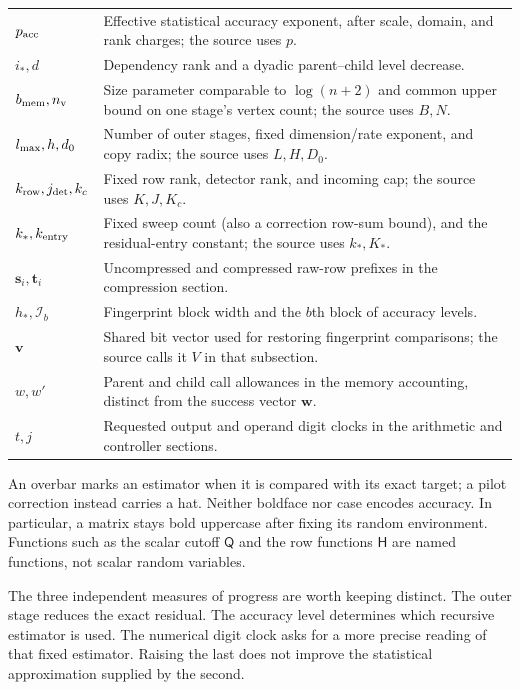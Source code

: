 \documentclass[11pt]{article}
\numberwithin{equation}{section}
\theoremstyle{definition}
\theoremstyle{remark}
\begin{document}
\begin{longtable}{@{}p{}p{}@{}}
$p_{\rm acc}$ & Effective statistical accuracy exponent, after scale, domain, and rank charges; the source uses $p$.\\
$i_*,d$ & Dependency rank and a dyadic parent--child level decrease.\\
$b_{\rm mem},n_{\rm v}$ & Size parameter comparable to $\log(n+2)$ and common upper bound on one stage's vertex count; the source uses $B,N$.\\
$l_{\rm max},h,d_0$ & Number of outer stages, fixed dimension/rate exponent, and copy radix; the source uses $L,H,D_0$.\\
$k_{\rm row},j_{\rm det},k_c$ & Fixed row rank, detector rank, and incoming cap; the source uses $K,J,K_c$.\\
$k_*,k_{\rm entry}$ & Fixed sweep count (also a correction row-sum bound), and the residual-entry constant; the source uses $k_*,K_*$.\\
$\mathbf s_i,\mathbf t_i$ & Uncompressed and compressed raw-row prefixes in the compression section.\\
$h_*,\mathcal I_b$ & Fingerprint block width and the $b$th block of accuracy levels.\\
$\mathbf v$ & Shared bit vector used for restoring fingerprint comparisons; the source calls it $V$ in that subsection.\\
$w,w'$ & Parent and child call allowances in the memory accounting, distinct from the success vector $\mathbf w$.\\
$t,j$ & Requested output and operand digit clocks in the arithmetic and controller sections.\\
\bottomrule
\end{longtable}

An overbar marks an estimator when it is compared with its exact target; a pilot correction instead carries a hat. Neither boldface nor case encodes accuracy. In particular, a matrix stays bold uppercase after fixing its random environment. Functions such as the scalar cutoff $\mathsf Q$ and the row functions $\mathsf H$ are named functions, not scalar random variables.

The three independent measures of progress are worth keeping distinct. The outer stage reduces the exact residual. The accuracy level determines which recursive estimator is used. The numerical digit clock asks for a more precise reading of that fixed estimator. Raising the last does not improve the statistical approximation supplied by the second.
\end{document}

